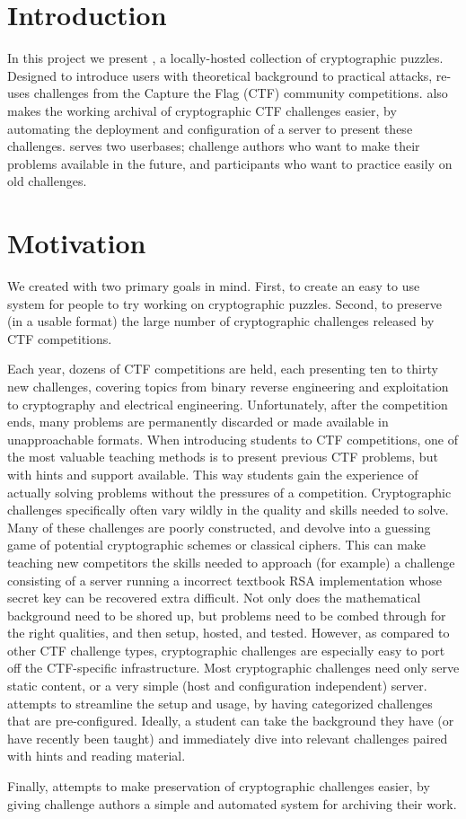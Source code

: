 \section{Introduction}
In this project we present \cvm{}, a locally-hosted collection of
cryptographic puzzles. Designed to introduce users with theoretical
background to practical attacks, \cvm{} re-uses challenges from the
Capture the Flag (CTF)\cite{ctftime:whatisctf} community
competitions. \cvm{} also makes the working archival of cryptographic
CTF challenges easier, by automating the deployment and configuration
of a server to present these challenges. \cvm{} serves two userbases;
challenge authors who want to make their problems available in the
future, and participants who want to practice easily on old
challenges.


\section{Motivation}
We created \cvm{} with two primary goals in mind. First, to create an
easy to use system for people to try working on cryptographic
puzzles. Second, to preserve (in a usable format) the large number of
cryptographic challenges released by CTF competitions.

Each year, dozens of CTF competitions are held, each presenting ten to
thirty new challenges, covering topics from binary reverse engineering
and exploitation to cryptography and electrical
engineering. Unfortunately, after the competition ends, many problems
are permanently discarded or made available in unapproachable
formats. When introducing students to CTF competitions, one of the
most valuable teaching methods is to present previous CTF problems,
but with hints and support available. This way students gain the
experience of actually solving problems without the pressures of a
competition. Cryptographic challenges specifically often vary wildly
in the quality and skills needed to solve. Many of these challenges
are poorly constructed, and devolve into a guessing game of potential
cryptographic schemes or classical ciphers. This can make teaching new
competitors the skills needed to approach (for example) a challenge
consisting of a server running a incorrect textbook RSA implementation
whose secret key can be recovered extra difficult. Not only does the
mathematical background need to be shored up, but problems need to be
combed through for the right qualities, and then setup, hosted, and
tested. However, as compared to other CTF challenge types,
cryptographic challenges are especially easy to port off the
CTF-specific infrastructure. Most cryptographic challenges need only
serve static content, or a very simple (host and configuration
independent) server. \cvm{} attempts to streamline the setup and
usage, by having categorized challenges that are
pre-configured. Ideally, a student can take the background they have
(or have recently been taught) and immediately dive into relevant
challenges paired with hints and reading material.

Finally, \cvm{} attempts to make preservation of cryptographic
challenges easier, by giving challenge authors a simple and automated
system for archiving their work.
